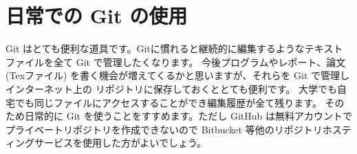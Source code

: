 \documentclass[a4paper,11pt, article]{memoir}
\begin{document}



\section*{日常での Git の使用}
Git はとても便利な道具です。Gitに慣れると継続的に編集するようなテキストファイルを全て Git で管理したくなります。
今後プログラムやレポート、論文(Texファイル) を書く機会が増えてくるかと思いますが、それらを Git で管理しインターネット上の
リポジトリに保存しておくととても便利です。
大学でも自宅でも同じファイルにアクセスすることができ編集履歴が全て残ります。
そのため日常的に Git を使うことをすすめます。ただし GitHub は無料アカウントでプライベートリポジトリを作成できないので
Bitbucket 等他のリポジトリホスティングサービスを使用した方がよいでしょう。
\end{document}
